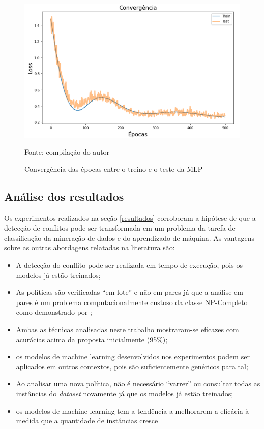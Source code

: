 \begin{figure}[h!]
	\centering
	\includegraphics[width=.6\textwidth]{imagens/convergencia.png}
	\caption{Convergência das épocas entre o treino e o teste da MLP}
	\label{fig:convergencia}
	{\scriptsize Fonte: compilação do autor}
\end{figure}

\subsection{Análise dos resultados}\label{analise_resultados}
Os experimentos realizados na seção \ref{resultados} corroboram a hipótese de que a detecção de conflitos pode ser transformada em um problema da tarefa de classificação da mineração de dados e do aprendizado de máquina. As vantagens sobre as outras abordagens relatadas na literatura são:
\begin{itemize}
	\item A detecção do conflito pode ser realizada em tempo de execução, pois os modelos já estão treinados;	
	\item As políticas são verificadas ``em lote'' e não em pares já que a análise em pares é um problema computacionalmente custoso da classe NP-Completo como demonstrado por \cite{shoham_tennenholtz_1995}; 
	\item Ambas as técnicas analisadas neste trabalho mostraram-se eficazes com acurácias acima da proposta inicialmente (95\%);
	\item os modelos de machine learning desenvolvidos nos experimentos podem ser aplicados em outros contextos, pois são suficientemente genéricos para tal;
	\item Ao analisar uma nova política, não é necessário ``varrer'' ou consultar todas as instâncias do \textit{dataset} novamente já que os modelos já estão treinados;
	\item os modelos de machine learning tem a tendência a melhorarem a eficácia à medida que a quantidade de instâncias cresce
\end{itemize}

